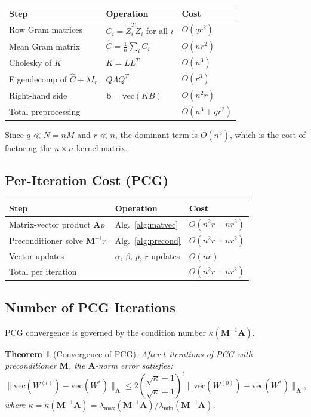 \documentclass[12pt]{article}
\newtheorem{theorem}{Theorem}
\theoremstyle{definition}
\begin{document}
\begin{center}
\begin{tabular}{lll}
\hline
Step & Operation & Cost \\
\hline
Row Gram matrices & $C_i = \tilde{Z}_i^T\tilde{Z}_i$ for all $i$ & $O(qr^2)$ \\
Mean Gram matrix & $\hat{C} = \frac{1}{n}\sum_i C_i$ & $O(nr^2)$ \\
Cholesky of $K$ & $K = LL^T$ & $O(n^3)$ \\
Eigendecomp of $\hat{C}+\lambda I_r$ & $Q\Lambda Q^T$ & $O(r^3)$ \\
Right-hand side & $\mathbf{b} = \mathrm{vec}(KB)$ & $O(n^2r)$ \\
\hline
Total preprocessing & & $O(n^3 + qr^2)$ \\
\hline
\end{tabular}
\end{center}

Since $q \ll N = nM$ and $r \ll n$, the dominant term is $O(n^3)$, which is the cost of factoring the $n\times n$ kernel matrix.

\subsection{Per-Iteration Cost (PCG)}

\begin{center}
\begin{tabular}{lll}
\hline
Step & Operation & Cost \\
\hline
Matrix-vector product $\mathbf{A}p$ & Alg.~\ref{alg:matvec} & $O(n^2r + nr^2)$ \\
Preconditioner solve $\mathbf{M}^{-1}r$ & Alg.~\ref{alg:precond} & $O(n^2r + nr^2)$ \\
Vector updates & $\alpha$, $\beta$, $p$, $r$ updates & $O(nr)$ \\
\hline
Total per iteration & & $O(n^2r + nr^2)$ \\
\hline
\end{tabular}
\end{center}

\subsection{Number of PCG Iterations}

PCG convergence is governed by the condition number $\kappa(\mathbf{M}^{-1}\mathbf{A})$.

\begin{theorem}[Convergence of PCG]\label{thm:pcg-conv}
After $t$ iterations of PCG with preconditioner $\mathbf{M}$, the $\mathbf{A}$-norm error satisfies:
\[
\|\mathrm{vec}(W^{(t)}) - \mathrm{vec}(W^*)\|_{\mathbf{A}} \leq 2\left(\frac{\sqrt{\kappa} - 1}{\sqrt{\kappa}+1}\right)^t \|\mathrm{vec}(W^{(0)}) - \mathrm{vec}(W^*)\|_{\mathbf{A}},
\]
where $\kappa = \kappa(\mathbf{M}^{-1}\mathbf{A}) = \lambda_{\max}(\mathbf{M}^{-1}\mathbf{A})/\lambda_{\min}(\mathbf{M}^{-1}\mathbf{A})$.
\end{theorem}
\end{document}
